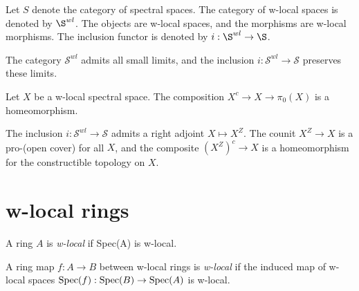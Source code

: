 \begin{lemma}
\begin{definition}
    Let \(S\) denote the category of spectral spaces. The category of w-local spaces is denoted by \(\S^{wl}\). The objects are w-local spaces, and the morphisms are w-local morphisms. The inclusion functor is denoted by \(i: \S^{wl} \to \S\).
\end{definition}

\begin{lemma}
    \label{lem:w-local-space-preserves-limits}

    The category $\mathcal{S}^{wl}$ admits all small limits, and the inclusion $i : \mathcal{S}^{wl} \to \mathcal{S}$ preserves these limits.
\end{lemma}


\begin{lemma}
    \label{lem:w-local-space-connected-components}

    Let $X$ be a w-local spectral space. The composition $X^c \to X \to \pi_0(X)$ is a homeomorphism.
\end{lemma}

\begin{definition}
    \label{def:w-localization-space}
    The inclusion $i : \mathcal{S}^{wl} \to \mathcal{S}$ admits a right adjoint $X \mapsto X^Z$. The counit $X^Z \to X$ is a pro-(open cover) for all $X$, and the composite $(X^Z)^c \to X$ is a homeomorphism for the constructible topology on $X$.
\end{definition}

\section{w-local rings}

\begin{definition}
    A ring \(A\) is \emph{w-local} if Spec(A) is w-local.
    \label{def:w-local-ring}
\end{definition}

\begin{definition}
    A ring map \(f: A \to B\) between w-local rings is \emph{w-local} if the induced map of w-local spaces \(\operatorname{Spec}(f) : \operatorname{Spec}(B) \to \operatorname{Spec}(A)\) is w-local.
    \label{def:w-local-ring-map}
\end{definition}


\end{lemma}

